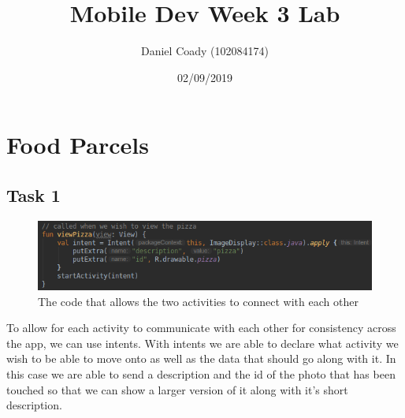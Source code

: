 \documentclass{scrartcl}
\title{Mobile Dev Week 3 Lab}
\author{Daniel Coady (102084174)}
\date{02/09/2019}
\begin{document}
\maketitle

\section*{Food Parcels}
\subsection*{Task 1}
\begin{figure}[h]
    \centering
    \includegraphics[scale=0.6]{images/screen1.png}
    \caption{The code that allows the  two activities to connect with each other}
\end{figure}

To allow for each activity to communicate with each other for consistency across the app,
we can use intents. With intents we are able to declare what activity we wish to be able to
move onto as well as the data that should go along with it. In this case we are able to send
a description and the id of the photo that has been touched so that we can show a larger version
of it along with it's short description.

\pagebreak
\end{document}
